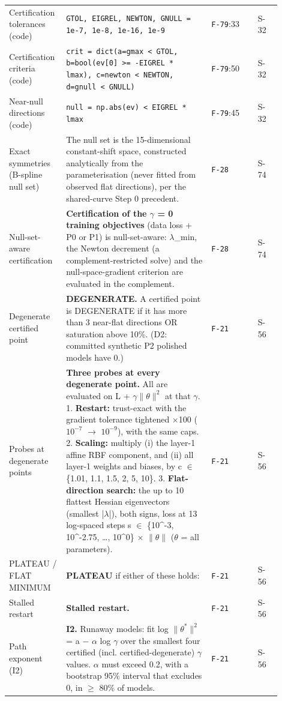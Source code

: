 {\begin{longtable}{R{0.16\linewidth} R{0.50\linewidth} R{0.16\linewidth} R{0.08\linewidth}}
Certification tolerances (code) & \texttt{GTOL, EIGREL, NEWTON, GNULL = 1e-7, 1e-8, 1e-16, 1e-9} & \texttt{F-79}:33 & S-32 \\
Certification criteria (code) & \texttt{crit = dict(a=gmax < GTOL, b=bool(ev[0] >= -EIGREL * lmax), c=newton < NEWTON, d=gnull < GNULL)} & \texttt{F-79}:50 & S-32 \\
Near-null directions (code) & \texttt{null = np.abs(ev) < EIGREL * lmax} & \texttt{F-79}:45 & S-32 \\
Exact symmetries (B-spline null set) & The null set is the 15-dimensional constant-shift space, constructed analytically from the parameterisation (never fitted from observed flat directions), per the shared-curve Step 0 precedent. & \texttt{F-28} & S-74 \\
Null-set-aware certification & \textbf{Certification of the $\gamma$ = 0 training objectives} (data loss + P0 or P1) is null-set-aware: $\lambda$\_min, the Newton decrement (a complement-restricted solve) and the null-space-gradient criterion are evaluated in the complement. & \texttt{F-28} & S-74 \\
Degenerate certified point & \textbf{DEGENERATE.} A certified point is DEGENERATE if it has more than 3 near-flat directions OR saturation above 10\%. (D2: committed synthetic P2 polished models have 0.) & \texttt{F-21} & S-56 \\
Probes at degenerate points & \textbf{Three probes at every degenerate point.} All are evaluated on L + $\gamma\|\theta\|^{2}$ at that $\gamma$. 1. \textbf{Restart:} trust-exact with the gradient tolerance tightened $\times$100 ($10^{-7}$ $\to$\allowbreak{} $10^{-9}$), with the same caps. 2. \textbf{Scaling:} multiply (i) the layer-1 affine RBF component, and (ii) all layer-1 weights and biases, by c $\in$ \{1.01, 1.1, 1.5, 2, 5, 10\}. 3. \textbf{Flat-direction search:} the up to 10 flattest Hessian eigenvectors (smallest |$\lambda$|), both signs, loss at 13 log-spaced steps s $\in$ \{10\^{}-3, 10\^{}-2.75, \ldots{}, 10\^{}0\} $\times$ $\|\theta\|$ ($\theta$ = all parameters). & \texttt{F-21} & S-56 \\
PLATEAU / FLAT MINIMUM & \textbf{PLATEAU} if either of these holds: & \texttt{F-21} & S-56 \\
Stalled restart & \textbf{Stalled restart.} & \texttt{F-21} & S-56 \\
Path exponent (I2) & \textbf{I2.} Runaway models: fit log $\|\theta^{*}\|^{2}$ = a $-$ $\alpha$ log $\gamma$ over the smallest four certified (incl. certified-degenerate) $\gamma$ values. $\alpha$ must exceed 0.2, with a bootstrap 95\% interval that excludes 0, in $\geq$ 80\% of models. & \texttt{F-21} & S-56 \\

\end{longtable}}
